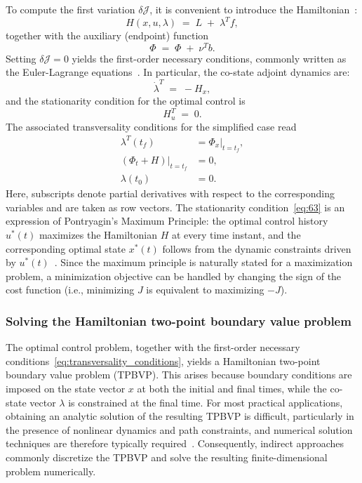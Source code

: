 To compute the first variation $\delta\mathcal{J}$, it is convenient to introduce the Hamiltonian~\cite{Optimization_Review}:
\begin{equation}
H(x,u,\lambda) \;=\; L \;+\; \lambda^{T} f ,
\tag{60}
\end{equation}
together with the auxiliary (endpoint) function
\begin{equation}
\Phi \;=\; \Phi \;+\; \nu^{T} b .
\tag{61}
\end{equation}
Setting $\delta\mathcal{J}=0$ yields the first-order necessary conditions, commonly written as the Euler-Lagrange equations~\cite{Optimization_Review}. In particular, the co-state adjoint dynamics are:
\begin{equation}
\dot{\lambda}^{T} \;=\; -H_{x},
\label{eq:62}
\end{equation}
and the stationarity condition for the optimal control is
\begin{equation}
H_{u}^{T} \;=\; 0 .
\label{eq:63}
\end{equation}
The associated transversality conditions for the simplified case read
\begin{equation}
\label{eq:transversality_conditions}
\begin{aligned}
\lambda^{T}(t_f) &= \left.\Phi_{x}\right|_{t=t_f}, \\
\left.(\Phi_{t}+H)\right|_{t=t_f} &= 0, \\
\lambda(t_0) &= 0. 
\end{aligned}
\end{equation}
Here, subscripts denote partial derivatives with respect to the corresponding variables and are taken as row vectors. The stationarity condition~\ref{eq:63} is an expression of Pontryagin's Maximum Principle: the optimal control history $u^{*}(t)$ maximizes the Hamiltonian $H$ at every time instant, and the corresponding optimal state $x^{*}(t)$ follows from the dynamic constraints driven by $u^{*}(t)$~\cite{BettsSurvey1998}. Since the maximum principle is naturally stated for a maximization problem, a minimization objective can be handled by changing the sign of the cost function (i.e., minimizing $J$ is equivalent to maximizing $-J$).


\subsubsection{Solving the Hamiltonian two-point boundary value problem}
The optimal control problem, together with the first-order necessary conditions~\ref{eq:transversality_conditions}, yields a Hamiltonian two-point boundary value problem (TPBVP). This arises because boundary conditions are imposed on the state vector $x$ at both the initial and final times, while the co-state vector $\lambda$ is constrained at the final time. For most practical applications, obtaining an analytic solution of the resulting TPBVP is difficult, particularly in the presence of nonlinear dynamics and path constraints, and numerical solution techniques are therefore typically required~\cite{Conway2012SurveyMethodsContinuousDynamicSystems}. Consequently, indirect approaches commonly discretize the TPBVP and solve the resulting finite-dimensional problem numerically.